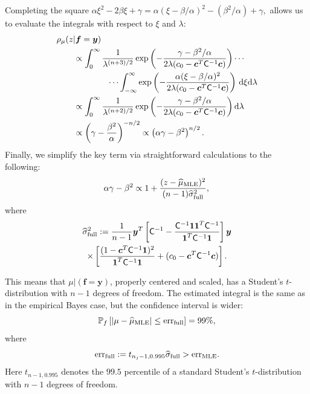 \documentclass[twocolumn]{svjour3}          %
\newcommand{\bm}[1]{\boldsymbol{#1}}
\newcommand{\D}[1]{\text{d}{#1}}
\newcommand{\vc}{\bm{c}}
\newcommand{\vf}{\bm{f}}
\newcommand{\vy}{\bm{y}}
\newcommand{\vone}{\bm{1}}
\newcommand{\mC}{\mathsf{C}}
\newcommand{\hmu}{\widehat{\mu}}
\newcommand{\hsigma}{\widehat{\sigma}}
\newcommand{\MLE}{\text{MLE}}
\newcommand{\err}{\textup{err}}
\begin{document}
Completing the square $
\alpha \xi^2 -2 \beta \xi + \gamma 
= \alpha (\xi -\beta/\alpha)^2  - (\beta^2/\alpha) + \gamma,
$
allows us to evaluate the integrals with respect to $\xi$ and $\lambda$:
\begin{align*}
\MoveEqLeft{\rho_{\mu}(z | \vf = \vy)} \\
& \propto \displaystyle \int_{0}^\infty  \frac{1}{\lambda^{(n+3)/2}}  \exp\left( -\frac{  \gamma - \beta^2/\alpha}{2\lambda(c_0  -\vc ^T \mC^{-1} \vc)} \right)  \cdots \\
& \qquad \qquad \cdots \int_{-\infty}^\infty  \exp\left( -\frac{\alpha (\xi -\beta/\alpha)^2}{2\lambda(c_0  -\vc ^T \mC^{-1} \vc)} \right) \, \D \xi \D \lambda \\
& \propto \displaystyle \int_{0}^\infty  \frac{1}{\lambda^{(n+2)/2}}  \exp\left( -\frac{  \gamma - \beta^2/\alpha}{2\lambda(c_0  -\vc ^T \mC^{-1} \vc)} \right) \D \lambda \\
& \propto \left(\gamma - \frac{\beta^2}{\alpha}\right)^{-n/2} \propto \left(\alpha \gamma - \beta^2\right)^{n/2}.
\end{align*}
Finally, we simplify the key term via straightforward calculations to the following:
\begin{equation*}
\alpha \gamma - \beta^2 \propto 1 +  \frac{(z - \hmu_{\textup{MLE}})^2}{(n-1)\widehat{\sigma}_{\textup{full}}^2}, \\
\end{equation*}
where 
\begin{multline}
\label{FJH:eq:signmaFull}
\hsigma^2_{\textup{full}} 
:= \frac{1}{n-1}
\vy^T\left[ \mC^{-1} 
- \frac{ \mC^{-1} \vone\vone^T \mC^{-1}}{\vone^T \mC^{-1} \vone}  \right]\vy
\\ 
\times  \left[\frac{(1 - \vc^T \mC^{-1} \vone)^2}{\vone^T \mC^{-1} \vone} + (c_0  -\vc ^T \mC^{-1} \vc) \right].
\end{multline}

This means that $\mu \vert (\vf = \vy )$, properly centered and scaled, has a Student's $t$-distribution with $n-1$ degrees of freedom.   The estimated integral is the same as in the empirical Bayes case, but the confidence interval is wider:
\begin{equation}
\label{eqn_prob_CI_full}
\mathbb{P}_f \left[
|\mu-\hmu_\MLE| \leq \err_{\textup{full}} \right]  = 99\%,
\end{equation}
where
\begin{equation}
\label{FJH:eq:errFull}
\err_{\textup{full}} 
:= t_{n_j-1,0.995} \hsigma_{\textup{full}} > \err_\MLE .
\end{equation}
Here $t_{n-1,0.995}$ denotes the $99.5$ percentile of a standard Student's $t$-distribution with $n-1$ degrees of freedom.
\end{document}
